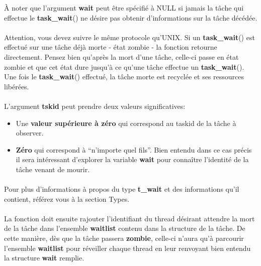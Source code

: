 \documentclass[10pt,a4wide]{article}
\begin{document}
\`A noter que l'argument \textbf{wait} peut \^etre sp\'ecifi\'e \`a NULL
si jamais la t\^ache qui effectue le \textbf{task\_wait}() ne d\'esire
pas obtenir d'informations sur la t\^ache d\'ec\'ed\'ee.

\paragraph{}

Attention, vous devez suivre le m\^eme protocole qu'UNIX. Si un
\textbf{task\_wait}() est effectu\'e sur une t\^ache d\'ej\`a morte -
\'etat zombie - la fonction retourne directement. Pensez bien qu'apr\`es
la mort d'une t\^ache, celle-ci passe en \'etat zombie et que cet \'etat
dure jusqu'\`a ce qu'une t\^ache effectue un \textbf{task\_wait}(). Une fois
le \textbf{task\_wait}() effectu\'e, la t\^ache morte est recycl\'ee
et ses ressources lib\'er\'ees.

\paragraph{}

L'argument \textbf{tskid} peut prendre deux valeurs significatives:

\begin{itemize}

\item Une \textbf{valeur sup\'erieure \`a z\'ero} qui correspond au taskid de
      la t\^ache \`a observer.

\item \textbf{Z\'ero} qui correspond \`a ``n'importe quel fils''. Bien entendu
      dans ce cas pr\'ecis il sera int\'eressant d'explorer la variable
      \textbf{wait} pour conna\^itre l'identit\'e de la t\^ache venant
      de mourir.

\end{itemize}

\paragraph{}

Pour plus d'informations \`a propos du type \textbf{t\_wait} et des
informations qu'il contient, r\'ef\'erez vous \`a la section Types.

\paragraph{}

La fonction doit ensuite rajouter l'identifiant du thread d\'esirant
attendre la mort de la t\^ache dans l'ensemble \textbf{waitlist} contenu
dans la structure de la t\^ache. De cette mani\`ere, d\`es que la t\^ache
passera \textbf{zombie}, celle-ci n'aura qu'\`a parcourir l'ensemble
\textbf{waitlist} pour r\'eveiller chaque thread en leur renvoyant bien
entendu la structure \textbf{wait} remplie.
\end{document}

